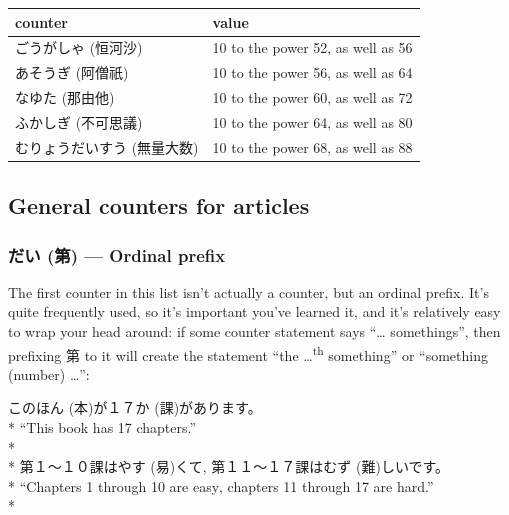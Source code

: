 \documentclass[11pt, b5paper, twoside, openright, onecolumn]{book}
\makeatletter
\newcommand*{\rtrubystack}[2]{{\relscale{0.5}%
  \begin{tabular}[b]{@{}c@{}}%
    {#1}\\%
    {\textscale{2}{#2}}%
  \end{tabular}}%
}
\DeclareRobustCommand*{\rtruby}[2]{%
  \mbox{%
    \setlength{\parskip}{0ex}%
    \BeginAccSupp{method=pdfstringdef,ActualText={#1}}%
      \rtrubystack{\phantom{#2}}{#1}%
      \llap{%
        \rtrubystack{#2}{\phantom{#1}}%
      }%
    \EndAccSupp{}%
  }%
}
\newcommand*{\rubystack}[2]{{\relscale{0.5}%
  \begin{tabular}[b]{@{}c@{}}%
    {#1}\\%
   {\textscale{2}{#2}}%
  \end{tabular}}%
}
\DeclareRobustCommand*{\ruby}[2]{%
  \mbox{%
    \setlength{\parskip}{0ex}%
    \BeginAccSupp{method=pdfstringdef,ActualText={#1}}%
      \rubystack{\phantom{#2}}{#1}%
      \llap{%
        \rubystack{#2}{\phantom{#1}}%
      }%
    \EndAccSupp{}%
  }%
}
\renewcommand*{\rtruby}[2]{#2 (#1)}%
\renewcommand*{\ruby}[2]{#2 (#1)}%
\newenvironment{exampleblock}{
\setlength{\parindent}{0.6in}
\begin{minipage}[t]{\dimexpr\textwidth-\parindent}}
{\end{minipage}}
\newenvironment{mytabularcentered}[1]{\noindent
\begin{center}\begin{tabular}[h]{#1}}{\end{tabular}\end{center}}
\makeatother
\begin{document}
\vspace{0.5cm}
\smaller
\begin{center}
\begin{mytabularcentered}{| l  l |}\hline 
\rule{0pt}{2.4ex}counter & value\\ 
\hline
\rule{0pt}{3.6ex}\index[japanese]{ごうがしゃ (恒河沙)}\rtruby{恒河沙}{ごうがしゃ}  & 10 to the power 52‚ as well as 56\\ 
\rule{0pt}{3.6ex}\index[japanese]{あそうぎ (阿僧祇)}\rtruby{阿僧祇}{あそうぎ} & 10 to the power 56‚ as well as 64\\ 
\rule{0pt}{3.6ex}\index[japanese]{なゆた (那由他)}\rtruby{那由他}{なゆた} & 10 to the power 60‚ as well as 72\\ 
\rule{0pt}{3.6ex}\index[japanese]{ふかしぎ (不可思議)}\rtruby{不可思議}{ふかしぎ} & 10 to the power 64‚ as well as 80\\ 
\rule{0pt}{3.6ex}\index[japanese]{むりょうだいすう (無量大数)}\rtruby{無量大数}{むりょうだいすう} & 10 to the power 68‚ as well as 88\\ 
\hline 
\end{mytabularcentered}
\end{center}
\larger
\subsection{General counters for articles}


\subsubsection{\ruby{第}{だい} — Ordinal prefix}

The first counter in this list isn’t actually a counter‚ but an ordinal prefix. It’s quite frequently used‚ so it’s important you’ve learned it‚ and it’s relatively easy to wrap your head around: if some counter statement says “… somethings”‚ then prefixing 第 to it will create the statement “the …\textsuperscript{th} something” or “something (number) …”:

\vspace{0.4cm}
\begin{exampleblock}
この\ruby{本}{ほん}が１７\ruby{課}{か}があります。 \\* 
“This book has 17 chapters.” \\* 
 \\* 
第１～１０課は\ruby{易}{やす}くて‚ 第１１～１７課は\ruby{難}{むず}しいです。 \\* 
“Chapters 1 through 10 are easy‚ chapters 11 through 17 are hard.” \\* 
\end{exampleblock}
\end{document}
